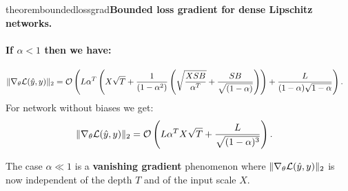 \begin{restatable}{theorem}{boundedlossgrad}{\normalfont\textbf{Bounded loss gradient for dense Lipschitz networks.}}
    \paragraph{If $\alpha<1$ then we have:}
    \begin{align}
        \|\nabla_{\theta}\mathcal{L}(\hat y,y)\|_2 &=\mathcal{O}\left(L\alpha^T\left(X\sqrt{T}+\frac{1}{(1-\alpha^2)}\left(\sqrt{\frac{XSB}{\alpha^T}}+\frac{SB}{\sqrt{(1-\alpha)}}\right)\right)+\frac{L}{(1-\alpha)\sqrt{1-\alpha}}\right).
    \end{align}
    For network without biases we get:
    \begin{align}
        \|\nabla_{\theta}\mathcal{L}(\hat y,y)\|_2 &=\mathcal{O}\left(L\alpha^TX\sqrt{T}+\frac{L}{\sqrt{(1-\alpha)^3}}\right).
    \end{align}
    
     The case $\alpha\ll 1$ is a \textbf{vanishing gradient} phenomenon where $\|\nabla_{\theta}\mathcal{L}(\hat y,y)\|_2$ is now independent of the depth $T$ and of the input scale $X$.
    \end{restatable}
